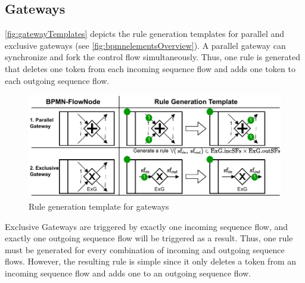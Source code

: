\documentclass{lmcs} %
\theoremstyle{plain}\newtheorem{satz}[thm]{Satz} %
\begin{document}
\subsection{Gateways}
\autoref{fig:gatewayTemplates} depicts the rule generation templates for parallel and exclusive gateways (see \autoref{fig:bpmnelementsOverview}).
A parallel gateway can synchronize and fork the control flow simultaneously.
Thus, one rule is generated that deletes one token from each incoming sequence flow and adds one token to each outgoing sequence flow.

\begin{figure}[ht]
    \centering
    \includegraphics[width=1\textwidth]{images/gateways_template.pdf}
    \caption{Rule generation template for gateways}
    \label{fig:gatewayTemplates}
\end{figure}

Exclusive Gateways are triggered by exactly one incoming sequence flow, and exactly one outgoing sequence flow will be triggered as a result.
Thus, one rule must be generated for every combination of incoming and outgoing sequence flows.
However, the resulting rule is simple since it only deletes a token from an incoming sequence flow and adds one to an outgoing sequence flow.
\end{document}
